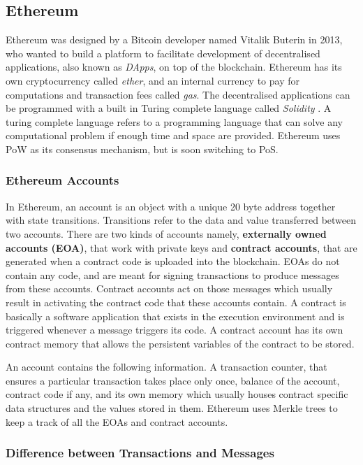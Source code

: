 \documentclass[english]{tktltiki}
\begin{document}
\subsection{Ethereum}

Ethereum was designed by a Bitcoin developer named Vitalik Buterin in 2013, who wanted to build a platform to facilitate development of decentralised applications, also known as \textit{DApps}, on top of the blockchain. Ethereum has its own cryptocurrency called \textit{ether}, and an internal currency to pay for computations and transaction fees called \textit{gas}. The decentralised applications can be programmed with a built in Turing complete language called \textit{Solidity} \cite{eth-whitepaper}. A turing complete language refers to a programming language that can solve any computational problem if enough time and space are provided. Ethereum uses PoW as its consensus mechanism, but is soon switching to PoS.

\subsubsection{Ethereum Accounts}

In Ethereum, an account is an object with a unique 20 byte address together with state transitions. Transitions refer to the data and value transferred between two accounts. There are two  kinds of accounts namely, \textbf{externally owned accounts (EOA)}, that work with private keys and \textbf{contract accounts}, that are generated when a contract code is uploaded into the blockchain. EOAs do not contain any code, and are meant for signing transactions to produce messages from these accounts. Contract accounts act on those messages which usually result in activating the contract code that these accounts contain. A contract is basically a software application that exists in the execution environment and is triggered whenever a message triggers its code. A contract account has its own contract memory that allows the persistent variables of the contract to be stored. 

An account contains the following information. A transaction counter, that ensures a particular transaction takes place only once, balance of the account, contract code if any, and its own memory which usually houses contract specific data structures and the values stored in them. Ethereum uses Merkle trees to keep a track of all the EOAs and contract accounts.

\subsubsection*{Difference between Transactions and Messages}
\end{document}
